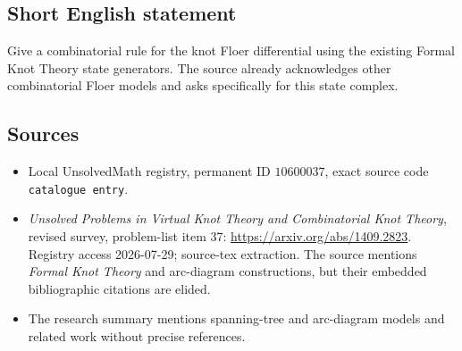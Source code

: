 \documentclass[11pt]{article}
\begin{document}
\subsection{Short English statement}
Give a combinatorial rule for the knot Floer differential using the existing Formal Knot Theory state generators. The source already acknowledges other combinatorial Floer models and asks specifically for this state complex.
\subsection{Sources}
\begin{itemize}
\item Local UnsolvedMath registry, permanent ID \(10600037\), exact source code \texttt{catalogue entry}.
\item \emph{Unsolved Problems in Virtual Knot Theory and Combinatorial Knot Theory}, revised survey, problem-list item 37: \url{https://arxiv.org/abs/1409.2823}. Registry access 2026-07-29; source-tex extraction. The source mentions \emph{Formal Knot Theory} and arc-diagram constructions, but their embedded bibliographic citations are elided.
\item The research summary mentions spanning-tree and arc-diagram models and related work without precise references.
\end{itemize}
\end{document}
